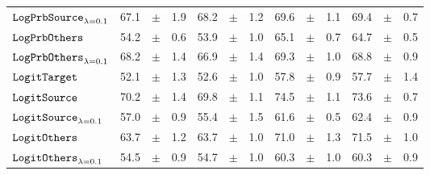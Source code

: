 \documentclass[../main.tex]{subfiles}
\begin{document}
\begin{tabular}{lrrrrrrrrrrrr}
$\mathtt{LogPrbSource}_{\lambda=0.1}$   & 67.1                            & $\pm$                                        & 1.9                        & 68.2                                                                                   & $\pm$ & 1.2                                & 69.6  & $\pm$ & 1.1             & 69.4  & $\pm$ & 0.7                           \\
$\mathtt{LogPrbOthers}_{}$              & 54.2                            & $\pm$                                        & 0.6                        & 53.9                                                                                 & $\pm$ & 1.0                                & 65.1  & $\pm$ & 0.7             & 64.7  & $\pm$ & 0.5                           \\
\rowcolor{lightgray}
$\mathtt{LogPrbOthers}_{\lambda=0.1}$   & 68.2                            & $\pm$                                        & 1.4                        & 66.9                                                                                   & $\pm$ & 1.4                                & 69.3  & $\pm$ & 1.0             & 68.8  & $\pm$ & 0.9                           \\
$\mathtt{LogitTarget}$                 & 52.1                            & $\pm$                                        & 1.3                        & 52.6                                                                                     & $\pm$ & 1.0                                & 57.8  & $\pm$ & 0.9             & 57.7  & $\pm$ & 1.4                           \\
\rowcolor{lightgray}
$\mathtt{LogitSource}_{}$               & 70.2                            & $\pm$                                        & 1.4                        & 69.8                                                                                   & $\pm$ & 1.1                                & 74.5  & $\pm$ & 1.1             & 73.6  & $\pm$ & 0.7                           \\
$\mathtt{LogitSource}_{\lambda=0.1}$    & 57.0                            & $\pm$                                        & 0.9                        & 55.4                                                                                   & $\pm$ & 1.5                                & 61.6  & $\pm$ & 0.5             & 62.4  & $\pm$ & 0.9                           \\
$\mathtt{LogitOthers}_{}$               & 63.7                            & $\pm$                                        & 1.2                        & 63.7                                                                                 & $\pm$ & 1.0                                & 71.0  & $\pm$ & 1.3             & 71.5  & $\pm$ & 1.0                           \\
$\mathtt{LogitOthers}_{\lambda=0.1}$    & 54.5                            & $\pm$                                        & 0.9                        & 54.7                                                                                   & $\pm$ & 1.0                                & 60.3  & $\pm$ & 1.0             & 60.3  & $\pm$ & 0.9                           \\
\bottomrule
\end{tabular}

\endgroup
\end{document}
